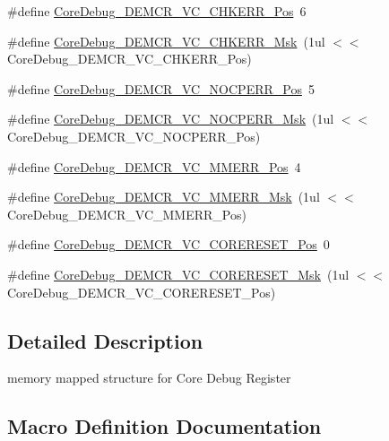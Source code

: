 \begin{DoxyCompactItemize}
\item 
\#define \hyperlink{group___c_m_s_i_s___c_m3___core_debug_ga10fc7c53bca904c128bc8e1a03072d50}{Core\+Debug\+\_\+\+D\+E\+M\+C\+R\+\_\+\+V\+C\+\_\+\+C\+H\+K\+E\+R\+R\+\_\+\+Pos}~6
\item 
\#define \hyperlink{group___c_m_s_i_s___c_m3___core_debug_ga2f98b461d19746ab2febfddebb73da6f}{Core\+Debug\+\_\+\+D\+E\+M\+C\+R\+\_\+\+V\+C\+\_\+\+C\+H\+K\+E\+R\+R\+\_\+\+Msk}~(1ul $<$$<$ Core\+Debug\+\_\+\+D\+E\+M\+C\+R\+\_\+\+V\+C\+\_\+\+C\+H\+K\+E\+R\+R\+\_\+\+Pos)
\item 
\#define \hyperlink{group___c_m_s_i_s___c_m3___core_debug_gac9d13eb2add61f610d5ced1f7ad2adf8}{Core\+Debug\+\_\+\+D\+E\+M\+C\+R\+\_\+\+V\+C\+\_\+\+N\+O\+C\+P\+E\+R\+R\+\_\+\+Pos}~5
\item 
\#define \hyperlink{group___c_m_s_i_s___c_m3___core_debug_ga03ee58b1b02fdbf21612809034562f1c}{Core\+Debug\+\_\+\+D\+E\+M\+C\+R\+\_\+\+V\+C\+\_\+\+N\+O\+C\+P\+E\+R\+R\+\_\+\+Msk}~(1ul $<$$<$ Core\+Debug\+\_\+\+D\+E\+M\+C\+R\+\_\+\+V\+C\+\_\+\+N\+O\+C\+P\+E\+R\+R\+\_\+\+Pos)
\item 
\#define \hyperlink{group___c_m_s_i_s___c_m3___core_debug_ga444454f7c7748e76cd76c3809c887c41}{Core\+Debug\+\_\+\+D\+E\+M\+C\+R\+\_\+\+V\+C\+\_\+\+M\+M\+E\+R\+R\+\_\+\+Pos}~4
\item 
\#define \hyperlink{group___c_m_s_i_s___c_m3___core_debug_gad420a9b60620584faaca6289e83d3a87}{Core\+Debug\+\_\+\+D\+E\+M\+C\+R\+\_\+\+V\+C\+\_\+\+M\+M\+E\+R\+R\+\_\+\+Msk}~(1ul $<$$<$ Core\+Debug\+\_\+\+D\+E\+M\+C\+R\+\_\+\+V\+C\+\_\+\+M\+M\+E\+R\+R\+\_\+\+Pos)
\item 
\#define \hyperlink{group___c_m_s_i_s___c_m3___core_debug_ga9fcf09666f7063a7303117aa32a85d5a}{Core\+Debug\+\_\+\+D\+E\+M\+C\+R\+\_\+\+V\+C\+\_\+\+C\+O\+R\+E\+R\+E\+S\+E\+T\+\_\+\+Pos}~0
\item 
\#define \hyperlink{group___c_m_s_i_s___c_m3___core_debug_ga906476e53c1e1487c30f3a1181df9e30}{Core\+Debug\+\_\+\+D\+E\+M\+C\+R\+\_\+\+V\+C\+\_\+\+C\+O\+R\+E\+R\+E\+S\+E\+T\+\_\+\+Msk}~(1ul $<$$<$ Core\+Debug\+\_\+\+D\+E\+M\+C\+R\+\_\+\+V\+C\+\_\+\+C\+O\+R\+E\+R\+E\+S\+E\+T\+\_\+\+Pos)
\end{DoxyCompactItemize}


\subsection{Detailed Description}
memory mapped structure for Core Debug Register 

\subsection{Macro Definition Documentation}
